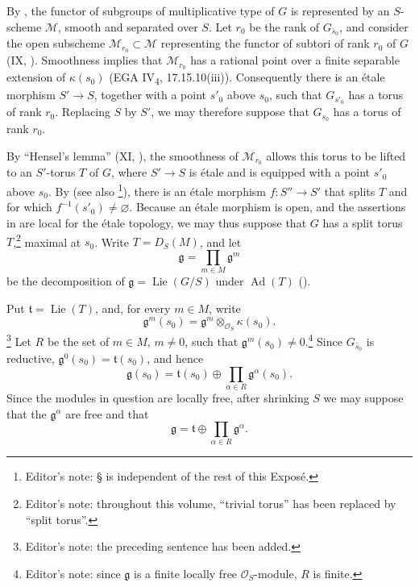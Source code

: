 By , the functor of subgroups of multiplicative
type of \(G\) is represented by an \(S\)-scheme \(\mathscr M\), smooth
and separated over \(S\).  Let \(r_0\) be the rank of
\(G_{\bar s_0}\), and consider the open subscheme
\(\mathscr M_{r_0}\subset\mathscr M\) representing the functor of
subtori of rank \(r_0\) of \(G\) (IX, ).  Smoothness implies that
\(\mathscr M_{r_0}\) has a rational point over a finite separable
extension of \(\kappa(s_0)\) (EGA IV\textsubscript{4}, 17.15.10(iii)).
Consequently there is an étale morphism \(S'\to S\), together with a
point \(s'_0\) above \(s_0\), such that \(G_{s'_0}\) has a torus of
rank \(r_0\).  Replacing \(S\) by \(S'\), we may therefore suppose
that \(G_{s_0}\) has a torus of rank \(r_0\).

By ``Hensel's lemma'' (XI, ), the smoothness of
\(\mathscr M_{r_0}\) allows this torus to be lifted to an \(S'\)-torus
\(T\) of \(G\), where \(S'\to S\) is étale and is equipped with a
point \(s'_0\) above \(s_0\).  By 
(see also \footnote{Editor's note: § is independent of the rest
of this Exposé.}), there is an étale morphism \(f\colon S''\to S'\)
that splits \(T\) and for which \(f^{-1}(s'_0)\ne\varnothing\).
Because an étale morphism is open, and the assertions in \textup{}
are local for the étale topology, we may thus suppose that \(G\) has
a split torus \(T\),\footnote{Editor's note: throughout this volume,
``trivial torus'' has been replaced by ``split torus''.} maximal at
\(s_0\).  Write \(T=D_S(M)\), and let
\[
  \mathfrak g=\prod_{m\in M}\mathfrak g^{m}
\]
be the decomposition of
\(\mathfrak g=\operatorname{Lie}(G/S)\) under
\(\operatorname{Ad}(T)\) ().

Put \(\mathfrak t=\operatorname{Lie}(T)\), and, for every \(m\in M\),
write
\[
  \mathfrak g^{m}(s_0)
  =
  \mathfrak g^{m}\otimes_{\mathcal O_S}\kappa(s_0).
\]
\footnote{Editor's note: the preceding sentence has been added.}
Let \(R\) be the set of \(m\in M\), \(m\ne0\), such that
\(\mathfrak g^{m}(s_0)\ne0\).\footnote{Editor's note: since
\(\mathfrak g\) is a finite locally free \(\mathcal O_S\)-module,
\(R\) is finite.}  Since \(G_{\bar s_0}\) is reductive,
\(\mathfrak g^{0}(s_0)=\mathfrak t(s_0)\), and hence
\[
  \mathfrak g(s_0)
  =
  \mathfrak t(s_0)
  \oplus
  \prod_{\alpha\in R}\mathfrak g^{\alpha}(s_0).
\]
Since the modules in question are locally free, after shrinking \(S\)
we may suppose that the \(\mathfrak g^{\alpha}\) are free and that
\[
  \mathfrak g
  =
  \mathfrak t
  \oplus
  \prod_{\alpha\in R}\mathfrak g^{\alpha}.
\]

